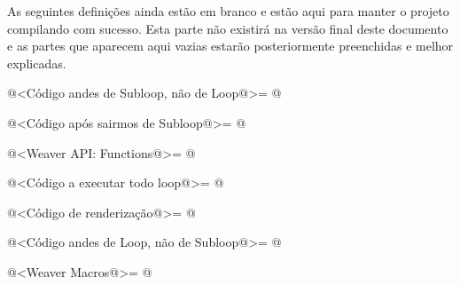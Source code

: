 
As seguintes definições ainda estão em branco e estão aqui para manter
o projeto compilando com sucesso. Esta parte não existirá na versão
final deste documento e as partes que aparecem aqui vazias estarão
posteriormente preenchidas e melhor explicadas.

\iniciocodigo
@<Código andes de Subloop, não de Loop@>=
@
\fimcodigo

\iniciocodigo
@<Código após sairmos de Subloop@>=
@
\fimcodigo

\iniciocodigo
@<Weaver API: Functions@>=
@
\fimcodigo

\iniciocodigo
@<Código a executar todo loop@>=
@
\fimcodigo

\iniciocodigo
@<Código de renderização@>=
@
\fimcodigo

\iniciocodigo
@<Código andes de Loop, não de Subloop@>=
@
\fimcodigo

\iniciocodigo
@<Weaver Macros@>=
@
\fimcodigo





\fim
